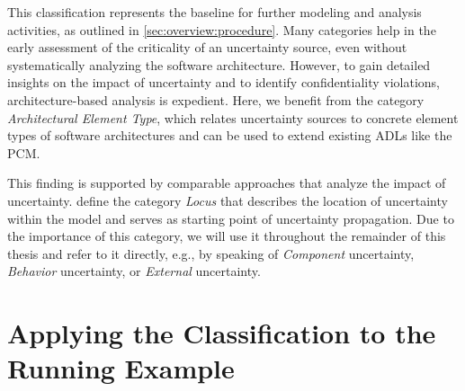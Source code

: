 
This classification represents the baseline for further modeling and analysis activities, as outlined in \autoref{sec:overview:procedure}.
Many categories help in the early assessment of the criticality of an uncertainty source, even without systematically analyzing the software architecture.
However, to gain detailed insights on the impact of uncertainty and to identify confidentiality violations, architecture-based analysis is expedient.
Here, we benefit from the category \emph{Architectural Element Type}, which relates uncertainty sources to concrete element types of software architectures and can be used to extend existing \acp{ADL} like the \ac{PCM}.


This finding is supported by comparable approaches \cite{acosta_uncertainty_2022,camara_uncertainty_2024} that analyze the impact of uncertainty.
\textcite{acosta_uncertainty_2022} define the category \emph{Locus} that describes the location of uncertainty within the model and serves as starting point of uncertainty propagation.
Due to the importance of this category, we will use it throughout the remainder of this thesis and refer to it directly, e.g., by speaking of \emph{Component} uncertainty, \emph{Behavior} uncertainty, or \emph{External} uncertainty.





\section{Applying the Classification to the Running Example}%
\label{sec:classification:runningexample}

